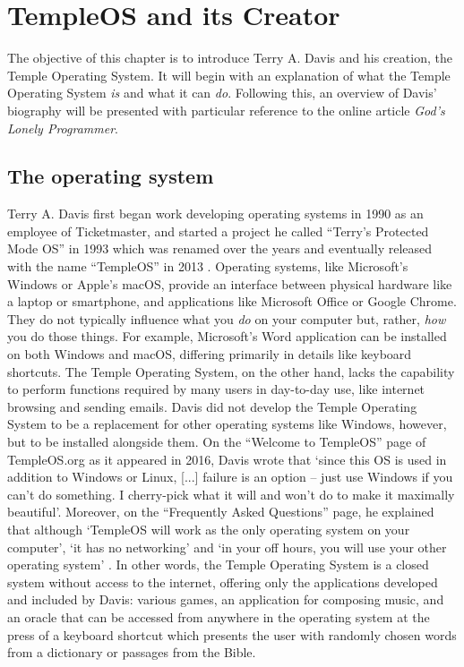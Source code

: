 \documentclass[Draft.tex]{subfiles}
\begin{document}
\chapter{TempleOS and its Creator}

The objective of this chapter is to introduce Terry A. Davis
and his creation, the Temple Operating System.
It will begin with an explanation of what the Temple Operating System
\textit{is} and what it can \textit{do}.
Following this, an overview of Davis' biography will be presented
with particular reference to the online article \textit{God's Lonely Programmer}.

\section*{The operating system}

Terry A. Davis first began work developing operating systems in 1990
as an employee of Ticketmaster, and started a project he called
``Terry's Protected Mode OS'' in 1993 which was renamed over the years
and eventually released with the name ``TempleOS'' in 2013
\parencite{History}.
Operating systems, like Microsoft's Windows or Apple's macOS,
provide an interface between physical hardware like a laptop or smartphone,
and applications like Microsoft Office or Google Chrome.
They do not typically influence what you \textit{do}
on your computer but, rather, \textit{how} you do those things.
For example, Microsoft's Word application can be installed on both
Windows and macOS, differing primarily in details like keyboard shortcuts.
The Temple Operating System, on the other hand,
lacks the capability to perform functions required by many users
in day-to-day use, like internet browsing and sending emails.
Davis did not develop the Temple Operating System to be a
replacement for other operating systems like Windows, however,
but to be installed alongside them.
On the ``Welcome to TempleOS'' page of TempleOS.org
as it appeared in 2016\footnotemark, Davis \parencite*{Welcome} wrote that
`since this OS is used in addition to Windows or Linux,
[...] failure is an option -- just use Windows if you can't do something.
I cherry-pick what it will and won't do to make it maximally beautiful'.
Moreover, on the ``Frequently Asked Questions'' page, he explained that
although `TempleOS will work as the only operating system on your computer',
`it has no networking' and `in your off hours,
you will use your other operating system' \parencite{FAQ}.
In other words, the Temple Operating System is a closed system
without access to the internet, offering only the applications
developed and included by Davis: various games,
an application for composing music, and an oracle that can be accessed
from anywhere in the operating system at the press of a keyboard shortcut
which presents the user with randomly
chosen words from a dictionary or passages from the Bible.
\end{document}
